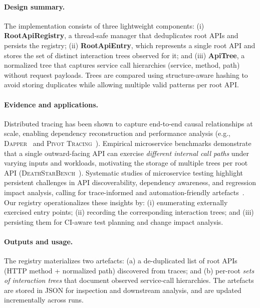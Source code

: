 \documentclass[conference]{IEEEtran}
\begin{document}
\paragraph{Design summary.}
The implementation consists of three lightweight components: (i) \textbf{RootApiRegistry}, a thread-safe manager that deduplicates root APIs and persists the registry; (ii) \textbf{RootApiEntry}, which represents a single root API and stores the set of distinct interaction trees observed for it; and (iii) \textbf{ApiTree}, a normalized tree that captures service call hierarchies (service, method, path) without request payloads. Trees are compared using structure-aware hashing to avoid storing duplicates while allowing multiple valid patterns per root API.

\paragraph{Evidence and applications.}
Distributed tracing has been shown to capture end-to-end causal relationships at scale, enabling dependency reconstruction and performance analysis (e.g., \textsc{Dapper}~\cite{sigelman2010dapper} and \textsc{Pivot Tracing}~\cite{mace2015pivot}). Empirical microservice benchmarks demonstrate that a single outward-facing API can exercise \emph{different internal call paths} under varying inputs and workloads, motivating the storage of multiple trees per root API (\textsc{DeathStarBench}~\cite{gan2019deathstarbench}). Systematic studies of microservice testing highlight persistent challenges in API discoverability, dependency awareness, and regression impact analysis, calling for trace-informed and automation-friendly artefacts~\cite{waseem2020testing}. Our registry operationalizes these insights by: (i) enumerating externally exercised entry points; (ii) recording the corresponding interaction trees; and (iii) persisting them for CI-aware test planning and change impact analysis.

\paragraph{Outputs and usage.}
The registry materializes two artefacts: (a) a de-duplicated list of root APIs (HTTP method + normalized path) discovered from traces; and (b) per-root \emph{sets of interaction trees} that document observed service-call hierarchies. The artefacts are stored in JSON for inspection and downstream analysis, and are updated incrementally across runs.
\end{document}
